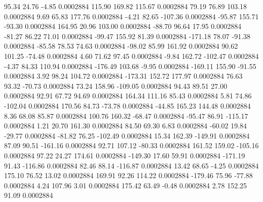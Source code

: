        95.34       24.76       -4.85     0.0002884
      115.90      169.82      115.67     0.0002884
       79.19       76.89      103.18     0.0002884
        9.69       65.83      177.76     0.0002884
       -4.21       82.65     -107.36     0.0002884
      -95.87      155.71      -93.30     0.0002884
      164.95       20.96      103.00     0.0002884
      -88.70       96.64       17.95     0.0002884
      -81.27       86.22       71.01     0.0002884
      -99.47      155.92       81.39     0.0002884
     -171.18       78.07      -91.38     0.0002884
      -85.58       78.53       74.63     0.0002884
      -98.02       85.99      161.92     0.0002884
       90.62      101.25      -74.48     0.0002884
        4.60       71.62       97.45     0.0002884
       -9.84      162.72     -102.47     0.0002884
       -4.37       84.33      110.94     0.0002884
     -176.49      103.68       -9.95     0.0002884
     -169.11      155.90      -91.55     0.0002884
        3.92       98.24      104.72     0.0002884
     -173.31      152.72      177.97     0.0002884
       76.63       93.32      -70.73     0.0002884
       73.24      158.96     -109.05     0.0002884
       94.43       89.51       27.00     0.0002884
       92.91       67.72       94.69     0.0002884
      164.34      111.16       85.43     0.0002884
        5.81       74.86     -102.04     0.0002884
      170.56       84.73      -73.78     0.0002884
      -44.85      165.23      144.48     0.0002884
        8.36       68.08       85.87     0.0002884
      100.76      160.32      -68.47     0.0002884
      -95.47       86.91     -115.17     0.0002884
        1.21       20.70      161.30     0.0002884
       84.50       69.30        6.83     0.0002884
      -60.02       19.84      -29.77     0.0002884
      -81.82       76.25     -102.49     0.0002884
       15.34      162.39     -149.91     0.0002884
       87.09       90.51     -161.16     0.0002884
       92.71      107.12      -80.33     0.0002884
      161.52      159.02     -105.16     0.0002884
       97.22       24.27      174.61     0.0002884
     -149.30       17.60       59.91     0.0002884
     -171.19       91.43     -116.86     0.0002884
       82.46       88.14     -116.87     0.0002884
       13.42       68.65       -4.25     0.0002884
      175.10       76.52       13.02     0.0002884
      169.91       92.26      114.22     0.0002884
     -179.46       75.96      -77.88     0.0002884
        4.24      107.96        3.01     0.0002884
      175.42       63.49       -0.48     0.0002884
        2.78      152.25       91.09     0.0002884
